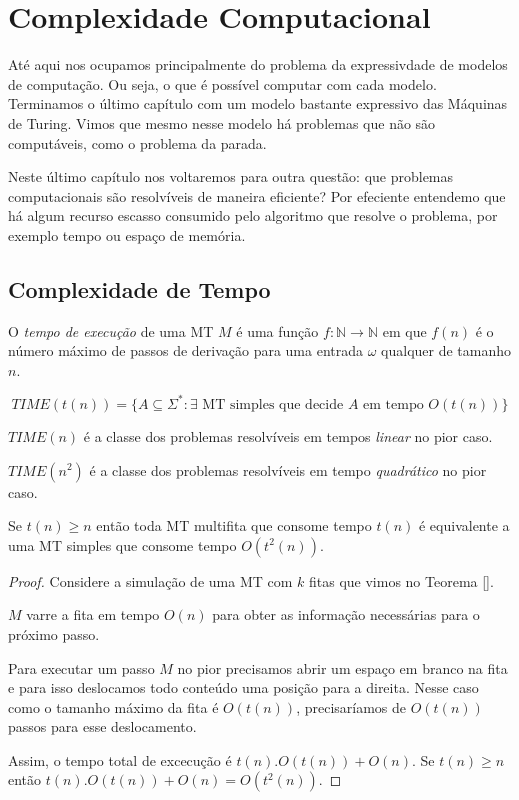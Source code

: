 \chapter{Complexidade Computacional}
\label{cha:complexidade}

Até aqui nos ocupamos principalmente do problema da expressivdade de modelos de computação.
Ou seja, o que é possível computar com cada modelo.
Terminamos o último capítulo com um modelo bastante expressivo das Máquinas de Turing.
Vimos que mesmo nesse modelo há problemas que não são computáveis, como o problema da parada.

Neste último capítulo nos voltaremos para outra questão: que problemas computacionais são resolvíveis de maneira eficiente?
Por efeciente entendemo que há algum recurso escasso consumido pelo algoritmo que resolve o problema, por exemplo tempo ou espaço de memória.

\section{Complexidade de Tempo}
\label{sec:tempo}

O {\em tempo de execução} de uma MT $M$ é uma função $f: \mathbb{N} \to \mathbb{N}$ em que $f(n)$ é o número máximo de passos de derivação para uma entrada $\omega$ qualquer de tamanho $n$.

\begin{displaymath}
  TIME(t(n)) = \{A \subseteq \Sigma^* : \textrm{$\exists$ MT simples que decide $A$ em tempo $O(t(n))$}\}
\end{displaymath}

\begin{example}
  $TIME(n)$ é a classe dos problemas resolvíveis em tempos {\em linear} no pior caso.

  $TIME(n^2)$ é a classe dos problemas resolvíveis em tempo {\em quadrático} no pior caso.
\end{example}

\begin{theorem}
  Se $t(n) \geq n$ então toda MT multifita que consome tempo $t(n)$ é equivalente a uma MT simples que consome tempo $O(t^2(n))$.
\end{theorem}
\begin{proof}
  Considere a simulação de uma MT com $k$ fitas que vimos no Teorema \ref{}.

  $M$ varre a fita em tempo $O(n)$ para obter as informação necessárias para o próximo passo.

  Para executar um passo $M$ no pior precisamos abrir um espaço em branco na fita e para isso deslocamos todo conteúdo uma posição para a direita.
  Nesse caso como o tamanho máximo da fita é $O(t(n))$, precisaríamos de $O(t(n))$ passos para esse deslocamento.

  Assim, o tempo total de excecução é $t(n).O(t(n)) + O(n)$.
  Se $t(n) \geq n$ então $t(n).O(t(n)) + O(n) = O(t^2(n))$.
\end{proof}

